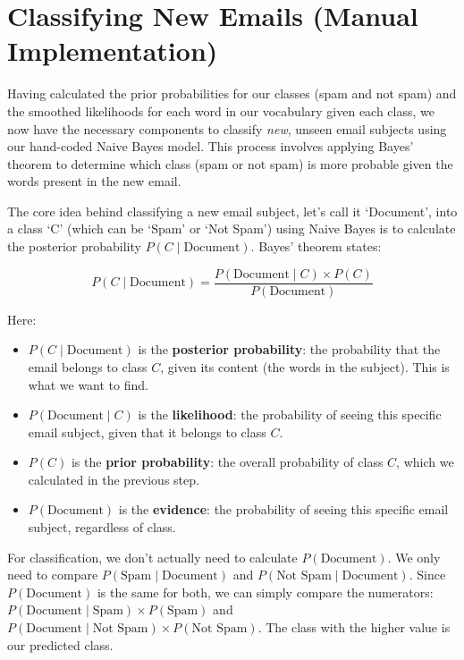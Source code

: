 \documentclass[12pt,letterpaper]{article}
\begin{document}
\section{Classifying New Emails (Manual Implementation)}

Having calculated the prior probabilities for our classes (spam and not spam) and the smoothed likelihoods for each word in our vocabulary given each class, we now have the necessary components to classify \textit{new}, unseen email subjects using our hand-coded Naive Bayes model. This process involves applying Bayes' theorem to determine which class (spam or not spam) is more probable given the words present in the new email.

The core idea behind classifying a new email subject, let's call it `Document', into a class `C' (which can be `Spam' or `Not Spam') using Naive Bayes is to calculate the posterior probability $P(C \mid \text{Document})$. Bayes' theorem states:

\begin{equation}
P(C \mid \text{Document}) = \frac{P(\text{Document} \mid C) \times P(C)}{P(\text{Document})}
\end{equation}

Here:
\begin{itemize}
    \item $P(C \mid \text{Document})$ is the \textbf{posterior probability}: the probability that the email belongs to class $C$, given its content (the words in the subject). This is what we want to find.
    \item $P(\text{Document} \mid C)$ is the \textbf{likelihood}: the probability of seeing this specific email subject, given that it belongs to class $C$.
    \item $P(C)$ is the \textbf{prior probability}: the overall probability of class $C$, which we calculated in the previous step.
    \item $P(\text{Document})$ is the \textbf{evidence}: the probability of seeing this specific email subject, regardless of class.
\end{itemize}

For classification, we don't actually need to calculate $P(\text{Document})$. We only need to compare $P(\text{Spam} \mid \text{Document})$ and $P(\text{Not Spam} \mid \text{Document})$. Since $P(\text{Document})$ is the same for both, we can simply compare the numerators: $P(\text{Document} \mid \text{Spam}) \times P(\text{Spam})$ and $P(\text{Document} \mid \text{Not Spam}) \times P(\text{Not Spam})$. The class with the higher value is our predicted class.
\end{document}
